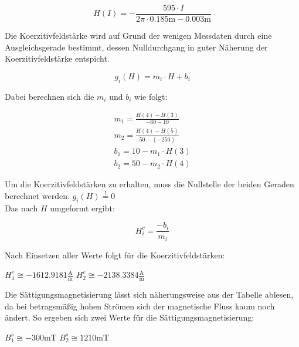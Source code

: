 \begin{equation}
H(I)=-\frac{595\cdot I}{2\pi \cdot 0.185\si{\m}-0.003\si{\m}}
\end{equation}

Die Koerzitivfeldstärke wird auf Grund der wenigen Messdaten durch eine Ausgleichsgerade bestimmt, dessen
Nulldurchgang in guter Näherung der Koerzitivfeldstärke entspicht.

\begin{equation}
g_i(H)=m_i\cdot H+b_i
\end{equation}
  
Dabei berechnen sich die $m_i$ und $b_i$ wie folgt:

\begin{gather}
m_1=\frac{H(4)-H(3)}{-60-10} \\
m_2=\frac{H(4)-H(5)}{50-(-250)}\\
b_1=10-m_1\cdot H(3)\\
b_2=50-m_2\cdot H(4)
\end{gather}

Um die Koerzitivfeldstärken zu erhalten, muss die Nullstelle der beiden Geraden berechnet werden. \quad $g_i(H) \stackrel{!}{=}0$\\
Das nach $H$ umgeformt ergibt:

\begin{equation}
H_{i}^{c}=\frac{-b_i}{m_i}
\end{equation}

Nach Einsetzen aller Werte folgt für die Koerzitivfeldstärken:

\quad $H_{1}^{c}\cong -1612.9181 \frac{\si{\ampere}}{\si{\m}}$
\quad $H_{2}^{c}\cong -2138.3384 \frac{\si{\ampere}}{\si{\m}}$

Die Sättigungsmagnetisierung lässt sich näherungsweise aus der Tabelle ablesen, da bei betragsmäßig hohen
Strömen sich der magnetische Fluss kaum noch ändert. So ergeben sich zwei Werte für die Sättigungsmagnetisierung:

\quad $B_{1}^{s}\cong -300 \si{\milli\tesla}$
\quad $B_{2}^{s}\cong 1210 \si{\milli\tesla}$
























